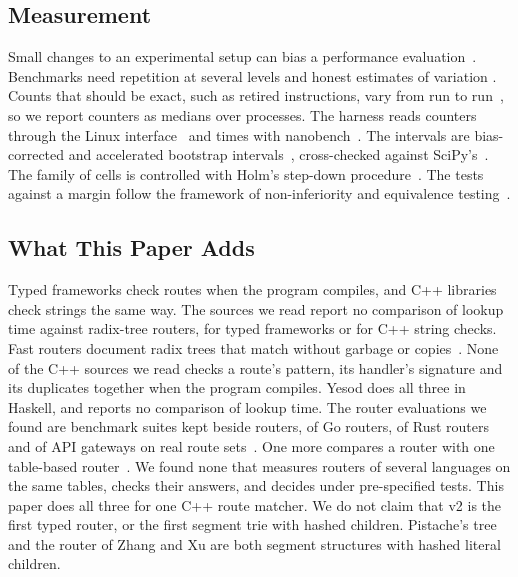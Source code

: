 \subsection{Measurement}

Small changes to an experimental setup can bias a performance evaluation~\cite{mytkowicz2009wrong}.
Benchmarks need repetition at several levels and honest estimates of variation
\cite{georges2007rigorous,kalibera2013rigorous,hoefler2015scientific,curtsinger2013stabilizer,laaber2019cloud}.
Counts that should be exact, such as retired instructions, vary from run to
run~\cite{weaver2013nondeterminism}, so we report counters as medians over processes. The harness
reads counters through the Linux interface~\cite{manpages2026perfeventopen,browne2000papi} and times
with nanobench~\cite{leitnerankerl2026nanobench}. The intervals are bias-corrected and accelerated
bootstrap intervals~\cite{efron1987bca,efron1993bootstrap,diciccio1996bootstrap}, cross-checked
against SciPy's~\cite{virtanen2020scipy}. The family of cells is controlled with Holm's step-down
procedure~\cite{holm1979simple}. The tests against a margin follow the framework of non-inferiority
and equivalence testing~\cite{schuirmann1987tost,wellek2010testing}.

\subsection{What This Paper Adds}

Typed frameworks check routes when the program compiles, and C++ libraries check strings the same
way. The sources we read report no comparison of lookup time against radix-tree routers, for typed
frameworks or for C++ string checks. Fast routers document radix trees that match without garbage or
copies~\cite{schmidt2019httprouter,ahmed2026matchit}. None of the C++ sources we read checks a route's
pattern, its handler's signature and its duplicates together when the program compiles. Yesod does
all three in Haskell, and reports no comparison of lookup time. The router evaluations we found are
benchmark suites kept beside routers, of Go routers, of Rust routers and of API gateways on real route
sets~\cite{schmidt2020gohttproutingbench,ahmed2026matchit,sworn2026wayfind,vm0012024gateways}. One
more compares a router with one table-based router~\cite{zhang2015urlrouting}. We found none that
measures routers of several languages on the same tables, checks their answers, and decides
under pre-specified tests. This paper does all three for one C++ route matcher. We do not claim that
v2 is the first typed router, or the first segment trie with hashed children. Pistache's tree and the
router of Zhang and Xu are both segment structures with hashed literal children.
